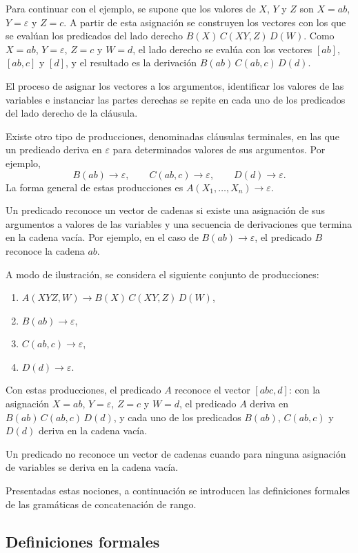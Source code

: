 \documentclass{report}
\theoremstyle{definition}
\theoremstyle{plain}
\theoremstyle{remark}
\begin{document}
Para continuar con el ejemplo, se supone que los valores de $X$, $Y$ y
$Z$ son $X = ab$, $Y = \varepsilon$ y $Z = c$. A partir de esta
asignación se construyen los vectores con los que se evalúan los
predicados del lado derecho $B(X)\, C(XY, Z)\, D(W)$. Como $X = ab$,
$Y = \varepsilon$, $Z = c$ y $W = d$, el lado derecho se evalúa con los
vectores $[ab]$, $[ab, c]$ y $[d]$, y el resultado es la derivación
$B(ab)\, C(ab, c)\, D(d)$.

El proceso de asignar los vectores a los argumentos, identificar los
valores de las variables e instanciar las partes derechas se repite en
cada uno de los predicados del lado derecho de la cláusula.

Existe otro tipo de producciones, denominadas cláusulas terminales, en
las que un predicado deriva en $\varepsilon$ para determinados valores
de sus argumentos. Por ejemplo,
\[
  B(ab) \to \varepsilon, \qquad
  C(ab, c) \to \varepsilon, \qquad
  D(d) \to \varepsilon.
\]
La forma general de estas producciones es
$A(X_1, \dots, X_n) \to \varepsilon$.

Un predicado reconoce un vector de cadenas si existe una asignación de
sus argumentos a valores de las variables y una secuencia de
derivaciones que termina en la cadena vacía. Por ejemplo, en el caso de
$B(ab) \to \varepsilon$, el predicado $B$ reconoce la cadena $ab$.

A modo de ilustración, se considera el siguiente conjunto de
producciones:
\begin{enumerate}
  \item $A(XYZ, W) \to B(X)\, C(XY, Z)\, D(W)$,
  \item $B(ab) \to \varepsilon$,
  \item $C(ab, c) \to \varepsilon$,
  \item $D(d) \to \varepsilon$.
\end{enumerate}
Con estas producciones, el predicado $A$ reconoce el vector $[abc, d]$:
con la asignación $X = ab$, $Y = \varepsilon$, $Z = c$ y $W = d$, el
predicado $A$ deriva en $B(ab)\, C(ab, c)\, D(d)$, y cada uno de los
predicados $B(ab)$, $C(ab, c)$ y $D(d)$ deriva en la cadena vacía.

Un predicado no reconoce un vector de cadenas cuando para ninguna
asignación de variables se deriva en la cadena vacía.

Presentadas estas nociones, a continuación se introducen las
definiciones formales de las gramáticas de concatenación de rango.

\subsection{Definiciones formales}
\end{document}
